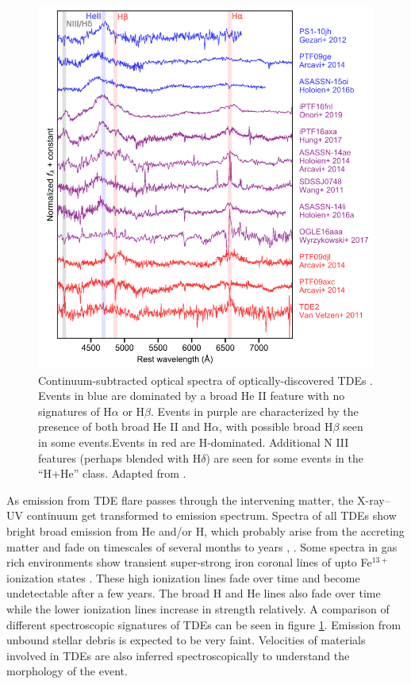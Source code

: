 \documentclass{tda}
\begin{document}
\begin{figure}
	\centering
	\captionsetup{width=.85\linewidth}
	\includegraphics[width=.5\linewidth]{./images/arcavi2014.png}
	\caption{Continuum-subtracted optical spectra of optically-discovered TDEs \cite{arcavi_continuum_2014}. Events in blue are dominated by
a broad He II feature with no signatures of H\(\alpha\) or H\(\beta\). Events in purple
are characterized by the presence of both broad He II and H\(\alpha\), with possible broad H\(\beta\) seen in some events.Events in red are H-dominated. Additional N III features (perhaps blended with
H\(\delta\)) are seen for some events in the “H+He” class. Adapted from \cite{van_velzen_optical-ultraviolet_2020}.}
	\label{fig:spectrographs}
\end{figure}

As emission from TDE flare passes through the intervening matter, the X-ray--UV continuum get transformed to emission spectrum. Spectra of all TDEs show bright broad emission from He and/or H, which probably arise from the accreting matter \cite{guillochon_hydrodynamical_2013, komossa_tidal_2015} and fade on timescales of several months to years \cite{komossa_tidal_2015, wang_transient_2011}, . Some spectra in gas rich environments show transient super-strong iron coronal lines of upto Fe\(^{13+}\) ionization states \cite{wang_transient_2011}. These high ionization lines fade over time and become undetectable after a few years. The broad H and He lines also fade over time while the lower ionization lines increase in strength relatively. A comparison of different spectroscopic signatures of TDEs can be seen in figure \ref{fig:spectrographs}. Emission from unbound stellar debris is expected to be very faint. Velocities of materials involved in TDEs are also inferred spectroscopically to understand the morphology of the event.
\end{document}
